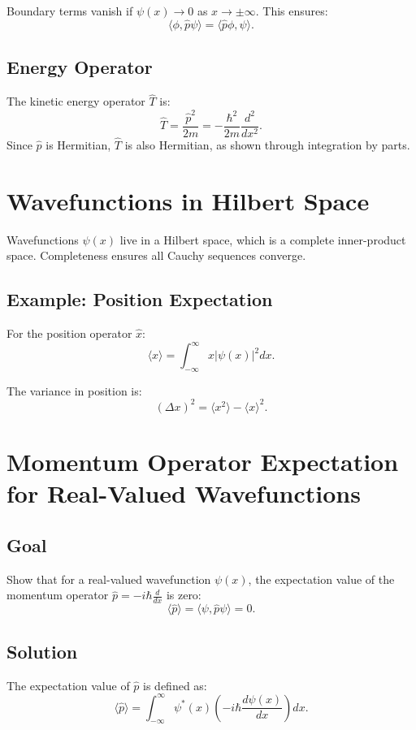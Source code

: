 \documentclass[a4paper,12pt]{article}
\begin{document}
\begin{multicols}{2}
Boundary terms vanish if $\psi(x) \to 0$ as $x \to \pm\infty$. This ensures:
\[
\langle \phi, \hat{p} \psi \rangle = \langle \hat{p} \phi, \psi \rangle.
\]

\subsection*{Energy Operator}
The kinetic energy operator $\hat{T}$ is:
\[
\hat{T} = \frac{\hat{p}^2}{2m} = -\frac{\hbar^2}{2m} \frac{d^2}{dx^2}.
\]
Since $\hat{p}$ is Hermitian, $\hat{T}$ is also Hermitian, as shown through integration by parts.

\section*{Wavefunctions in Hilbert Space}
Wavefunctions $\psi(x)$ live in a Hilbert space, which is a complete inner-product space. Completeness ensures all Cauchy sequences converge.

\subsection*{Example: Position Expectation}
For the position operator $\hat{x}$:
\[
\langle x \rangle = \int_{-\infty}^\infty x |\psi(x)|^2 dx.
\]

The variance in position is:
\[
(\Delta x)^2 = \langle x^2 \rangle - \langle x \rangle^2.
\]

\end{multicols}
\section*{Momentum Operator Expectation for Real-Valued Wavefunctions}

\subsection*{Goal}
Show that for a real-valued wavefunction $\psi(x)$, the expectation value of the momentum operator $\hat{p} = -i\hbar \frac{d}{dx}$ is zero:
\[
\langle \hat{p} \rangle = \langle \psi, \hat{p} \psi \rangle = 0.
\]

\subsection*{Solution}
The expectation value of $\hat{p}$ is defined as:
\[
\langle \hat{p} \rangle = \int_{-\infty}^\infty \psi^*(x) \left(-i\hbar \frac{d\psi(x)}{dx} \right) dx.
\]
\end{document}
